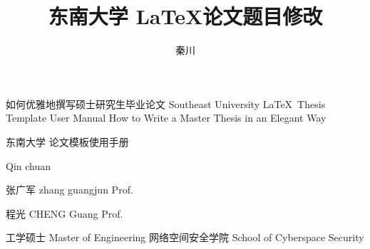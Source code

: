 \documentclass[algorithmlist,figurelist,tablelist,nomlist]{seumasterthesis}
\begin{document}

\title
    {东南大学 \LaTeX 论文题目修改}                                      %
    {如何优雅地撰写硕士研究生毕业论文}                                          %
    {Southeast University \LaTeX ~Thesis Template User Manual}  %
    {How to Write a Master Thesis in an Elegant Way}            %

\spine
    {东南大学  论文模板使用手册}      %
    {}                                                          %

\author
    {秦川}                        %
    {Qin chuan}                 %

\advisor
    {张广军}                       %
    {zhang guangjun}           %
    {Prof.}                     %

\coadvisor
    {程光}                        %
    {CHENG Guang}               %
    {Prof.}                     %

\degreetype                     %
    {工学硕士}
    {Master of Engineering}
\department                     %
    {网络空间安全学院}
    {School of Cyberspace Security}
\end{document}

